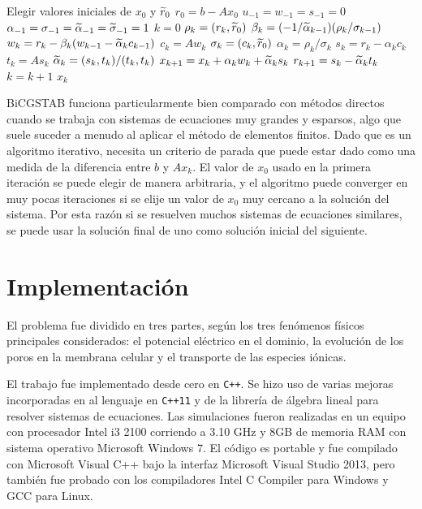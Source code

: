 \begin{algorithmic}
	\STATE Elegir valores iniciales de $x_0$ y $\widetilde{r}_0$
	\STATE $r_0 = b - A x_0$
	\STATE $u_{-1} = w_{-1} = s_{-1} = 0$
	\STATE $\alpha_{-1} = \sigma_{-1} = \widetilde{\alpha}_{-1} = \widetilde{\sigma}_{-1} = 1$
	\STATE $k = 0$
	\REPEAT
		\STATE $\rho_k = \left( r_k, \widetilde{r}_0 \right)$
		\STATE $\beta_k = (-1 / \widetilde{\alpha}_{k-1}) (\rho_k / \sigma_{k-1})$
		\STATE $w_k = r_k - \beta_k (w_{k-1} - \widetilde{\alpha}_{k} c_{k-1})$
		\STATE $c_k = A w_k$
		\STATE $\sigma_k = (c_k, \widetilde{r}_0)$
		\STATE $\alpha_k = \rho_k / \sigma_k$
		\STATE $s_k = r_k - \alpha_k c_k$
		\STATE $t_k = A s_k$ 
		\STATE $\widetilde{\alpha}_{k} = (s_k,t_k) / (t_k, t_k)$
		\STATE $x_{k+1} = x_k + \alpha_k w_k + \widetilde{\alpha}_{k} s_k$
		\STATE $r_{k+1} = s_k - \widetilde{\alpha}_{k} t_k$
		\STATE $k = k + 1$
	\RETURN $x_k$
\end{algorithmic}

BiCGSTAB funciona particularmente bien comparado con métodos directos cuando se trabaja con sistemas de ecuaciones muy grandes y esparsos, algo que suele suceder a menudo al aplicar el método de elementos finitos. Dado que es un algoritmo iterativo, necesita un criterio de parada que puede estar dado como una medida de la diferencia entre $b$ y $A x_k$. El valor de $x_0$ usado en la primera iteración se puede elegir de manera arbitraria, y el algoritmo puede converger en muy pocas iteraciones si se elije un valor de $x_0$ muy cercano a la solución del sistema. Por esta razón si se resuelven muchos sistemas de ecuaciones similares, se puede usar la solución final de uno como solución inicial del siguiente. 

\section{Implementación}
El problema fue dividido en tres partes, según los tres fenómenos físicos principales considerados: el potencial eléctrico en el dominio, la evolución de los poros en la membrana celular y el transporte de las especies iónicas. 

El trabajo fue implementado desde cero en \texttt{C++}. Se hizo uso de varias mejoras incorporadas en al lenguaje en \texttt{C++11} y de la librería de álgebra lineal  para resolver sistemas de ecuaciones. Las simulaciones fueron realizadas en un equipo con procesador Intel i3 2100 corriendo a 3.10 GHz y 8GB de memoria RAM con sistema operativo Microsoft Windows 7. El código es portable y fue compilado con Microsoft Visual C++ bajo la interfaz Microsoft Visual Studio 2013, pero también fue probado con los compiladores Intel C Compiler para Windows y GCC para Linux.

